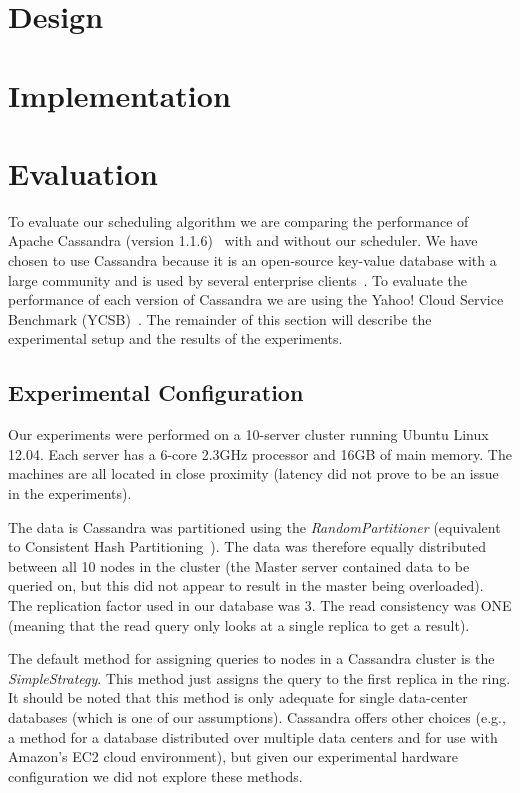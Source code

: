\documentclass[]{acm_proc_article-sp}
\begin{document}
\section{Design}

\section{Implementation}

\section{Evaluation}
To evaluate our scheduling algorithm we are comparing the performance of Apache Cassandra (version 1.1.6)~\cite{Lakshman:2010:CDS:1773912.1773922} with and without our scheduler. We have chosen to use Cassandra because it is an open-source key-value database with a large community and is used by several enterprise clients~\cite{DataStaxCassandra}. To evaluate the performance of each version of Cassandra we are using the Yahoo! Cloud Service Benchmark (YCSB)~\cite{Cooper:2010:BCS:1807128.1807152}. The remainder of this section will describe the experimental setup and the results of the experiments.

\subsection{Experimental Configuration}
Our experiments were performed on a 10-server cluster running Ubuntu Linux 12.04. Each server has a 6-core 2.3GHz processor and 16GB of main memory. The machines are all located in close proximity (latency did not prove to be an issue in the experiments).

The data is Cassandra was partitioned using the \textit{RandomPartitioner} (equivalent to Consistent Hash Partitioning~\cite{http://www.paperplanes.de/2011/12/9/the-magic-of-consistent-hashing.html}). The data was therefore equally distributed between all 10 nodes in the cluster (the Master server contained data to be queried on, but this did not appear to result in the master being overloaded). The replication factor used in our database was 3. The read consistency was ONE (meaning that the read query only looks at a single replica to get a result).

The default method for assigning queries to nodes in a Cassandra cluster is the \textit{SimpleStrategy}. This method just assigns the query to the first replica in the ring. It should be noted that this method is only adequate for single data-center databases (which is one of our assumptions). Cassandra offers other choices (e.g., a method for a database distributed over multiple data centers and for use with Amazon’s EC2 cloud environment), but given our experimental hardware configuration we did not explore these methods.
\end{document}
